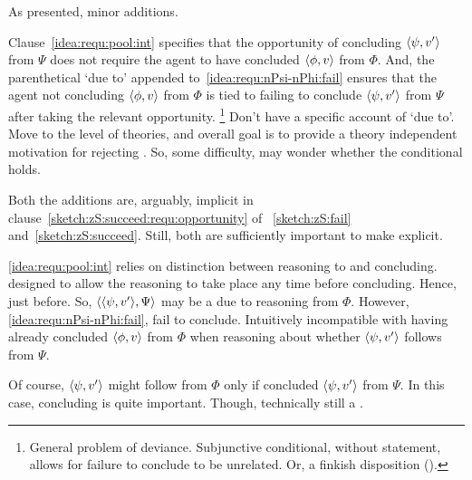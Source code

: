 \begin{note}
  As presented, minor additions.

  Clause~\ref{idea:requ:pool:int} specifies that the opportunity of concluding \(\langle \psi, v' \rangle\) from \(\Psi\) does not require the agent to have concluded \(\langle \phi, v \rangle\) from \(\Phi\).
  And, the parenthetical `due to' appended to~\ref{idea:requ:nPsi-nPhi:fail} ensures that the agent not concluding \(\langle \phi, v \rangle\) from \(\Phi\) is tied to failing to conclude \(\langle \psi, v' \rangle\) from \(\Psi\) after taking the relevant opportunity.%
  \footnote{
    General problem of deviance.
    Subjunctive conditional, without statement, allows for failure to conclude to be unrelated.
    Or, a finkish disposition (\cite[cf.][144]{Lewis:1997wg}).
  }
  Don't have a specific account of `due to'.
  Move to the level of theories, and overall goal is to provide a theory independent motivation for rejecting \issueConstraint{}.
  So, some difficulty, may wonder whether the conditional holds.
\end{note}

\begin{note}
  Both the additions are, arguably, implicit in clause~\ref{sketch:zS:succeed:requ:opportunity} of ~\ref{sketch:zS:fail} and~\ref{sketch:zS:succeed}.
  Still, both are sufficiently important to make explicit.

  \ref{idea:requ:pool:int} relies on distinction between reasoning to and concluding.
   designed to allow the reasoning to take place any time before concluding.
  Hence, just before.
  So, \(\langle \langle \psi, v' \rangle, \Psi \rangle\) may be a \requ{} due to reasoning from \(\Phi\).
  However, \ref{idea:requ:nPsi-nPhi:fail}, fail to conclude.
  Intuitively incompatible with having already concluded \(\langle \phi, v \rangle\) from \(\Phi\) when reasoning about whether \(\langle \psi, v' \rangle\) follows from \(\Psi\).

  Of course, \(\langle \psi, v' \rangle\) might follow from \(\Phi\) only if concluded \(\langle \psi, v' \rangle\) from \(\Psi\).
  In this case, concluding is quite important.
  Though, technically still a \requ{}.
\end{note}

